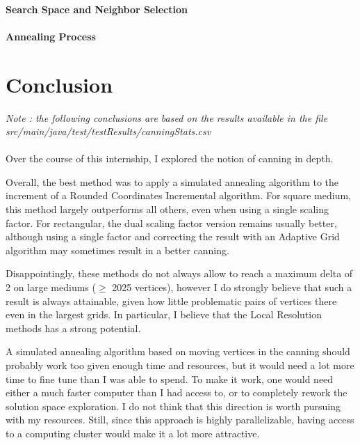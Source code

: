 \documentclass{report}
\begin{document}
\subsubsection{Search Space and Neighbor Selection}

\subsubsection{Annealing Process}

\chapter*{Conclusion}
\label{conclusion}

\textit{\small Note : the following conclusions are based on the results available in the file src/main/java/test/testResults/canningStats.csv}\\
$ $\\
Over the course of this internship, I explored the notion of canning in depth. 

Overall, the best method was to apply a simulated annealing algorithm to the increment of a Rounded Coordinates Incremental algorithm. For square medium, this method largely outperforms all others, even when using a single scaling factor. For rectangular, the dual scaling factor version remains usually better, although using a single factor and correcting the result with an Adaptive Grid algorithm may sometimes result in a better canning.

Disappointingly, these methods do not always allow to reach a maximum delta of 2 on large mediums ($\ge$ 2025 vertices), however I do strongly believe that such a result is always attainable, given how little problematic pairs of vertices there even in the largest grids. In particular, I believe that the Local Resolution methods has a strong potential. 

A simulated annealing algorithm based on moving vertices in the canning should probably work too given enough time and resources, but it would need a lot more time to fine tune than I was able to spend. To make it work, one would need either a much faster computer than I had access to, or to completely rework the solution space exploration. I do not think that this direction is worth pursuing with my resources. Still, since this approach is highly parallelizable, having access to a computing cluster would make it a lot more attractive.
\end{document}
